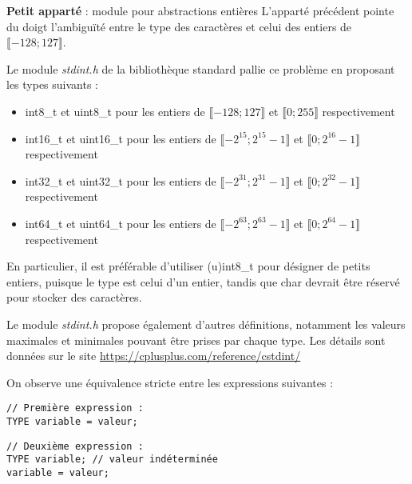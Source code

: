 \documentclass[../../../main.tex]{subfiles}
\begin{document}
\begin{minitelbasicbox}{\textbf{Petit apparté} : module pour abstractions entières}
L'apparté précédent pointe du doigt l'ambiguïté entre le type des caractères et celui des entiers de $\llbracket -128; 127\rrbracket$.

Le module \textit{stdint.h} de la bibliothèque standard pallie ce problème en proposant les types suivants :
\begin{itemize}
	\item \textsf{int8\_t} et \textsf{uint8\_t} pour les entiers de $\llbracket -128; 127\rrbracket$ et $\llbracket 0; 255\rrbracket$ respectivement
	\item \textsf{int16\_t} et \textsf{uint16\_t} pour les entiers de $\llbracket -2^{15}; 2^{15}-1\rrbracket$ et $\llbracket 0; 2^{16}-1\rrbracket$ respectivement
	\item \textsf{int32\_t} et \textsf{uint32\_t} pour les entiers de $\llbracket -2^{31}; 2^{31}-1\rrbracket$ et $\llbracket 0; 2^{32}-1\rrbracket$ respectivement
	\item \textsf{int64\_t} et \textsf{uint64\_t} pour les entiers de $\llbracket -2^{63}; 2^{63}-1\rrbracket$ et $\llbracket 0; 2^{64}-1\rrbracket$ respectivement
\end{itemize}
En particulier, il est préférable d'utiliser \textsf{(u)int8\_t} pour désigner de petits entiers, puisque le type est celui d'un entier, tandis que \textsf{char} devrait être réservé pour stocker des caractères.

Le module \textit{stdint.h} propose également d'autres définitions, notamment les valeurs maximales et minimales pouvant être prises par chaque type. Les détails sont données sur le site \url{https://cplusplus.com/reference/cstdint/}
\end{minitelbasicbox}
On observe une équivalence stricte entre les expressions suivantes : 

\begin{minipage}{0.5\textwidth}
\begin{verbatim}
// Première expression :
TYPE variable = valeur;

\end{verbatim}
\end{minipage}
\begin{minipage}{0.5\textwidth}
\begin{verbatim}
// Deuxième expression :
TYPE variable; // valeur indéterminée
variable = valeur;
\end{verbatim}
\end{minipage}
\end{document}
